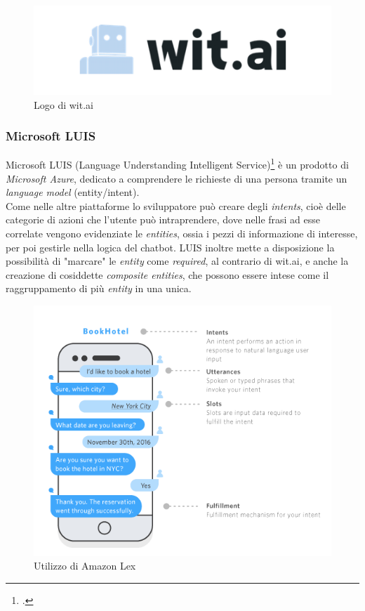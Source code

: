 \begin{figure}[h]
	\centering
	\includegraphics[scale=0.5]{../Immagini/witai.png}
	\caption{Logo di wit.ai}
\end{figure}

\subsubsection{Microsoft LUIS}
Microsoft LUIS (Language Understanding Intelligent Service)\footcite{luis} è un prodotto di \emph{Microsoft Azure}, dedicato a comprendere le richieste di una persona tramite un \emph{language model} (entity/intent). \\
Come nelle altre piattaforme lo sviluppatore può creare degli \emph{intents}, cioè delle categorie di azioni che l'utente può intraprendere, dove nelle frasi ad esse correlate vengono evidenziate le \emph{entities}, ossia i pezzi di informazione di interesse, per poi gestirle nella logica del \gls{chatbot}. LUIS inoltre mette a disposizione la possibilità di "marcare" le \emph{entity} come \emph{required}, al contrario di wit.ai, e anche la creazione di cosiddette \emph{composite entities}, che possono essere intese come il raggruppamento di più \emph{entity} in una unica.
\begin{figure}[h]
	\centering
	\includegraphics[scale=0.5]{../Immagini/lex_example.png}
	\caption{Utilizzo di Amazon Lex}
\end{figure}
